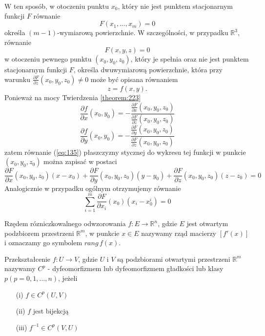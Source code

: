 \documentclass[leqno]{article}
\begin{document}
\begin{justify}
\begin{ex}
\begin{itemize}
        W ten sposób, w otoczeniu punktu $x_0$, który nie jest punktem stacjonarnym funkcji $F$ równanie 
        \[
            F(x_1, \ldots, x_m) = 0
        \]
        określa $(m-1)$-wymiarową powierzchnie. W szczególności, w przypadku $\mathbb{R}^3$, równanie 
        \[
            F(x,y,z) = 0
        \]
        w otoczeniu pewnego punktu $(x_0, y_0, z_0)$, który je spełnia oraz nie jest punktem stacjonarnym funkcji $F$, określa dwuwymiarową powierzchnie, która 
        przy warunku $\frac{\partial F}{\partial z}(x_0, y_0, z_0) \neq 0$ może być opisana równaniem 
        \[  
            z = f(x,y).
        \]
        Ponieważ na mocy Twierdzenia \ref{theorem:223}
        \[
            \frac{\partial f}{\partial x}(x_0, y_0) = -\frac{\frac{\partial F}{\partial x}(x_0, y_0, z_0)}{\frac{\partial F}{\partial z}(x_0, y_0, z_0)}
        \]
        \[
            \frac{\partial f}{\partial y}(x_0, y_0) = -\frac{\frac{\partial F}{\partial y}(x_0, y_0, z_0)}{\frac{\partial F}{\partial z}(x_0, y_0, z_0)}
        \]
        zatem równanie (\ref{eq:135}) płaszczyzny stycznej do wykresu tej funkcji w punkcie $(x_0, y_0, z_0)$ można zapisać w postaci 
        \[
            \frac{\partial F}{\partial x}(x_0,y_0, z_0)(x-x_0) + \frac{\partial F}{\partial y}(x_0, y_0, z_0)(y - y_0) + \frac{\partial F}{\partial z}(x_0, y_0, z_0)(z-z_0) = 0
        \]
        Analogicznie w przypadku ogólnym otrzymujemy równanie 
        \[
            \sum_{i=1}^{m}\frac{\partial F}{\partial x_i}(x_0)(x_i - x_0^i) = 0
        \]
    \end{itemize}
\end{ex}

\begin{defn}
    Rzędem rózniczkowalnego odwzorowania $f : E \to \mathbb{R}^n$, gdzie $E$ jest otwartym podzbiorem przestrzeni $\mathbb{R}^m$,
    w punkcie $x \in E$ nazywamy rząd macierzy $[f'(x)]$ i oznaczamy go symbolem $rang \, f(x)$. 
\end{defn}

\begin{defn}
    Przekształcenie $f : U \to V$, gdzie $U$ i $V$ są podzbiorami otwartymi przestrzeni $\mathbb{R}^m$ nazywamy $C^p$ - dyfeomorfizmem lub dyfeomorfizmem gładkości lub klasy $p (p = 0,1,\ldots, n)$, jeżeli 
    \begin{itemize}
        \item [(i)] $f \in C^p(U,V)$
        \item [(ii)] $f$ jest bijekcją
        \item [(iii)] $f^{-1} \in C^p(V, U)$
    \end{itemize}
\end{defn}


\end{justify}
\end{document}
